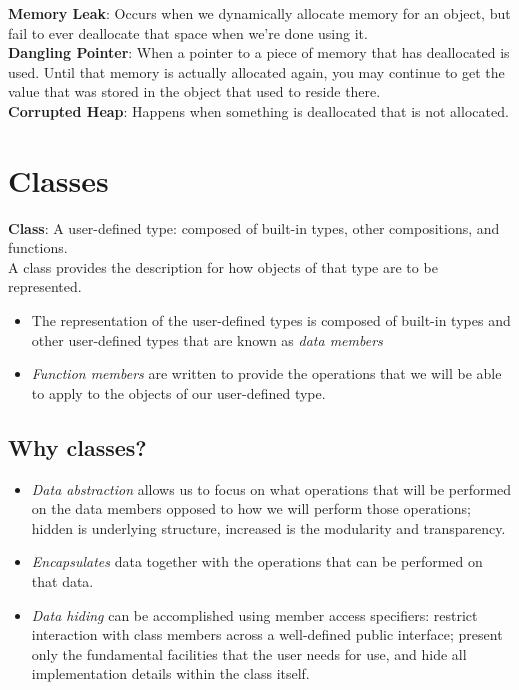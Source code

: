 \documentclass{article}
\begin{document}
	\textbf{Memory Leak}: Occurs when we dynamically allocate memory for an object, but fail to ever deallocate that space when we're done using it.\\
	
	\textbf{Dangling Pointer}: When a pointer to a piece of memory that has deallocated is used. Until that memory is actually allocated again, you may continue to get the value that was stored in the object that used to reside there.\\
	
	\textbf{Corrupted Heap}: Happens when something is deallocated that is not allocated.
	
	
	\section{Classes}
	
	\textbf{Class}: A user-defined type: composed of built-in types, other compositions, and functions.\\
	
	A class provides the description for how objects of that type are to be represented.
	\begin{itemize}
		\item The representation of the user-defined types is composed of built-in types and other user-defined types that are known as \textit{data members}
		\item \textit{Function members} are written to provide the operations that we will be able to apply to the objects of our user-defined type.
	\end{itemize}
	
	\subsection*{Why classes?}
	\begin{itemize}
		\item \textit{Data abstraction} allows us to focus on what operations that will be performed on the data members opposed to how we will perform those operations; hidden is underlying structure, increased is the modularity and transparency.
		\item \textit{Encapsulates} data together with the operations that can be performed on that data.
		\item \textit{Data hiding} can be accomplished using member access specifiers: restrict interaction with class members across a well-defined public interface; present only the fundamental facilities that the user needs for use, and hide all implementation details within the class itself.\\
	\end{itemize}
	
\end{document}
